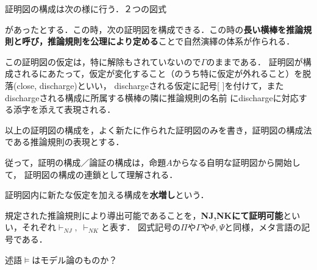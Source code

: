 \documentclass[uplatex, dvipdfmx]{jsreport}
\begin{document}
\begin{definition}[証明図の構成（合成）]
    証明図の構成は次の様に行う．２つの図式
        \begin{center}
        \end{center}
        があったとする．この時，次の証明図を構成できる．この時の\textbf{長い横棒を推論規則と呼び，推論規則を公理により定める}ことで自然演繹の体系が作られる．
        \begin{center}
        \end{center}
        この証明図の仮定は，特に解除もされていないので$\Gamma$のままである．
        証明図が構成されるにあたって，仮定が変化すること（のうち特に仮定が外れること）を脱落(close, discharge)といい，
        dischargeされる仮定に記号[ ]を付けて，またdischargeされる構成に所属する横棒の隣に推論規則の名前
        にdischargeに対応する添字を添えて表現される．
    
        以上の証明図の構成を，よく新たに作られた証明図のみを書き，証明図の構成法である推論規則の表現とする．
\end{definition}

従って，証明の構成／論証の構成は，命題$A$からなる自明な証明図から開始して，
証明図の構成の連鎖として理解される．

\begin{definition}[weakening]
    証明図内に新たな仮定を加える構成を\textbf{水増し}という．
\end{definition}

\begin{definition}[証明可能性]
    規定された推論規則により導出可能であることを，\textbf{NJ,NKにて証明可能}といい，それぞれ$\vdash_{NJ},\;\vdash_{NK}$と表す．
    図式記号の$\Pi$や$\Gamma$や$\Phi,\Psi$と同様，メタ言語の記号である．
\end{definition}
\begin{remark}
    述語$\vDash$はモデル論のものか？
\end{remark}
\end{document}
